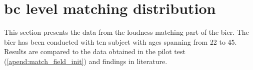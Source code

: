 \section{\gls{bc} level matching distribution}
This section presents the data from the loudness matching part of the \gls{bier}. 
The \gls{bier} has been conducted with ten subject with ages spanning from 22 to 45.
Results are compared to the data obtained in the pilot test (\autoref{apend:match_field_init}) and findings in literature.



